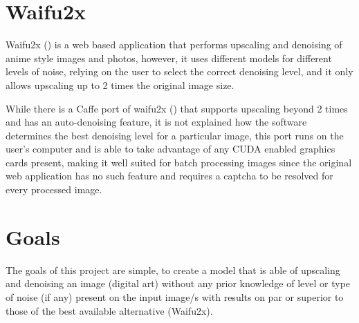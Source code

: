 \section{Waifu2x}

Waifu2x (\cite{waifu2x}) is a web based application that performs upscaling and denoising of anime style images and photos, however, it uses different models for different levels of noise, relying on the user to select the correct denoising level, and it only allows upscaling up to 2 times the original image size.

\hfill

While there is a Caffe port of waifu2x (\cite{waifu2x-caffe}) that supports upscaling beyond 2 times and has an auto-denoising feature, it is not explained how the software determines the best denoising level for a particular image, this port runs on the user's computer and is able to take advantage of any CUDA enabled graphics cards present, making it well suited for batch processing images since the original web application has no such feature and requires a captcha to be resolved for every processed image.

\section{Goals}

The goals of this project are simple, to create a model that is able of upscaling and denoising an image (digital art) without any prior knowledge of level or type of noise (if any) present on the input image/s with results on par or superior to those of the best available alternative (Waifu2x).

